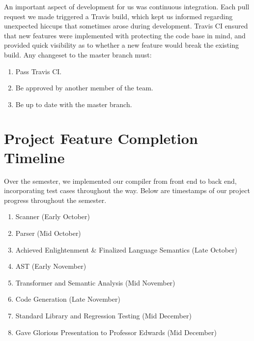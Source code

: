   \medskip \noindent
  An important aspect of development for us was continuous integration. Each pull request we made triggered a Travis build, which kept us informed regarding unexpected hiccups that sometimes arose during development. Travis CI ensured that new features were implemented with protecting the code base in mind, and provided quick visibility as to whether a new feature would break the existing build. Any changeset to the master branch must:

  \begin{enumerate}
    \item Pass Travis CI.
    \item Be approved by another member of the team.
    \item Be up to date with the master branch.
  \end{enumerate}

\section{Project Feature Completion Timeline}
Over the semester, we implemented our compiler from front end to back end, incorporating test cases throughout the way. Below are timestamps of our project progress throughout the semester.

  \begin{enumerate}
    \item Scanner (Early October)
    \item Parser (Mid October)
    \item Achieved Enlightenment \& Finalized Language Semantics (Late October)
    \item AST (Early November)
    \item Transformer and Semantic Analysis (Mid November)
    \item Code Generation (Late November)
    \item Standard Library and Regression Testing (Mid December)
    \item Gave Glorious Presentation to Professor Edwards (Mid December)
  \end{enumerate}


